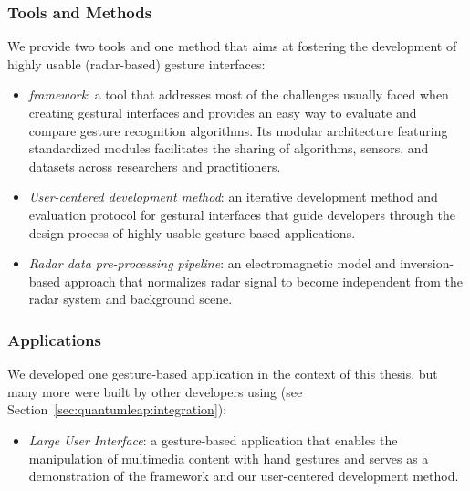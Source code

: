 \subsubsection{Tools and Methods}
We provide two tools and one method that aims at fostering the development of highly usable (radar-based) gesture interfaces:
\begin{itemize}
    \item \textit{\ql framework}: a tool that addresses most of the challenges usually faced when creating gestural interfaces and provides an easy way to evaluate and compare gesture recognition algorithms. Its modular architecture featuring standardized modules facilitates the sharing of algorithms, sensors, and datasets across researchers and practitioners.
    \item \textit{User-centered development method}: an iterative development method and evaluation protocol for gestural interfaces that guide developers through the design process of highly usable gesture-based applications.
    \item \textit{Radar data pre-processing pipeline}: an electromagnetic model and inversion-based approach that normalizes radar signal to become independent from the radar system and background scene.
\end{itemize}

\subsubsection{Applications}
We developed one gesture-based application in the context of this thesis, but many more were built by other developers using \ql (see Section~\ref{sec:quantumleap:integration}): 
\begin{itemize}
    \item \textit{Large User Interface}: a gesture-based application that enables the manipulation of multimedia content with hand gestures and serves as a demonstration of the \ql framework and our user-centered development method.
\end{itemize}

